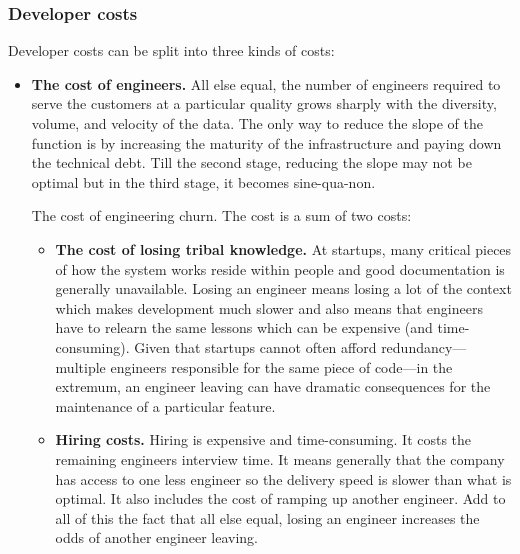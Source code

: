 \documentclass[12pt, letterpaper]{article}
\begin{document}
\subsubsection{Developer costs}

Developer costs can be split into three kinds of costs:
\begin{itemize}
    \item \textbf{The cost of engineers.} All else equal, the number of engineers required to serve the customers at a particular quality grows sharply with the diversity, volume, and velocity of the data. The only way to reduce the slope of the function is by increasing the maturity of the infrastructure and paying down the technical debt. Till the second stage, reducing the slope may not be optimal but in the third stage, it becomes sine-qua-non.

The cost of engineering churn. The cost is a sum of two costs:
\begin{itemize}
    \item  \textbf{The cost of losing tribal knowledge.} At startups, many critical pieces of how the system works reside within people and good documentation is generally unavailable. Losing an engineer means losing a lot of the context which makes development much slower and also means that engineers have to relearn the same lessons which can be expensive (and time-consuming). Given that startups cannot often afford redundancy—multiple engineers responsible for the same piece of code—in the extremum, an engineer leaving can have dramatic consequences for the maintenance of a particular feature. 

    \item \textbf{Hiring costs.} Hiring is expensive and time-consuming. It costs the remaining engineers interview time. It means generally that the company has access to one less engineer so the delivery speed is slower than what is optimal. It also includes the cost of ramping up another engineer.  Add to all of this the fact that all else equal, losing an engineer increases the odds of another engineer leaving. 
\end{itemize}


\end{itemize}
\end{document}
